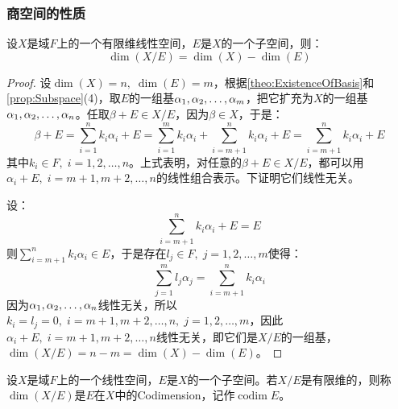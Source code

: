 \subsubsection{商空间的性质}
\begin{theorem}\label{theo:QuotientDim}
	设$X$是域$F$上的一个有限维线性空间，$E$是$X$的一个子空间，则：
	\begin{equation*}
		\dim(X/E)=\dim(X)-\dim(E)
	\end{equation*}
\end{theorem}
\begin{proof}
	设$\dim(X)=n,\;\dim(E)=m$，根据\cref{theo:ExistenceOfBasis}和\cref{prop:Subspace}(4)，取$E$的一组基$\alpha_1, \alpha_2, \dots, \alpha_{m}$，把它扩充为$X$的一组基$\alpha_1, \alpha_2, \dots, \alpha_{n}$。任取$\beta+E\in X/E$，因为$\beta\in X$，于是：
	\begin{equation*}
		\beta+E=\sum_{i=1}^{n}k_i\alpha_i+E=\sum_{i=1}^{m}k_i\alpha_i+\sum_{i=m+1}^{n}k_i\alpha_i+E=\sum_{i=m+1}^{n}k_i\alpha_i+E
	\end{equation*}
	其中$k_i\in F,\;i=1,2,\dots,n$。上式表明，对任意的$\beta+E\in X/E$，都可以用$\alpha_i+E,\;i=m+1,m+2,\dots,n$的线性组合表示。下证明它们线性无关。\par
	设：
	\begin{equation*}
		\sum_{i=m+1}^{n}k_i\alpha_i+E=E
	\end{equation*}
	则$\sum\limits_{i=m+1}^{n}k_i\alpha_i\in E$，于是存在$l_j\in F,\;j=1,2,\dots,m$使得：
	\begin{equation*}
		\sum_{j=1}^{m}l_j\alpha_j=\sum_{i=m+1}^{n}k_i\alpha_i
	\end{equation*}
	因为$\alpha_1, \alpha_2, \dots, \alpha_{n}$线性无关，所以$k_i=l_j=0,\;i=m+1,m+2,\dots,n,\;j=1,2,\dots,m$，因此$\alpha_i+E,\;i=m+1,m+2,\dots,n$线性无关，即它们是$X/E$的一组基，$\dim(X/E)=n-m=\dim(X)-\dim(E)$。
\end{proof}
\begin{definition}
	设$X$是域$F$上的一个线性空间，$E$是$X$的一个子空间。若$X/E$是有限维的，则称$\dim(X/E)$是$E$在$X$中的\gls{Codimension}，记作$\operatorname{codim}E$。
\end{definition}
